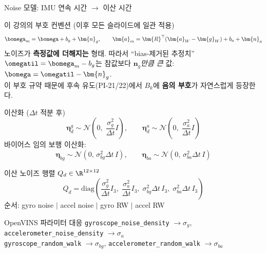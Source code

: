 \begin{frame}[shrink=15]{Noise 모델: IMU 연속 시간 $\to$ 이산 시간}

  \begin{alertblock}{\small 이 강의의 부호 컨벤션 (이후 모든 슬라이드에 일관 적용)}
    \footnotesize
    \[
      \bomega_m = \bomega + b_g + \bm{n}_g,\qquad
      \bm{a}_m = \bm{R}^\top(\bm{a}_W - \bm{g}_W) + b_a + \bm{n}_a
    \]
    노이즈가 \textbf{측정값에 더해지는} 형태. 따라서 ``bias-제거된 추정치''
    $\omegatil = \bomega_m - b_g$는 참값보다 \emph{$\bm{n}_g$만큼 큰} 값:
    $\bomega = \omegatil - \bm{n}_g$.\\
    이 부호 규약 때문에 후속 유도(PI-21/22)에서 $B_k$에 \textbf{음의 부호}가 자연스럽게 등장한다.
  \end{alertblock}

  \pause
  \vspace{0.4em}
  \begin{block}{이산화 ($\Delta t$ 적분 후)}
    \[
      \bm{\eta}_d^g \sim \mathcal{N}\!\left(0,\;\frac{\sigma_g^2}{\Delta t}I\right),
      \qquad
      \bm{\eta}_d^a \sim \mathcal{N}\!\left(0,\;\frac{\sigma_a^2}{\Delta t}I\right)
    \]
    바이어스 임의 보행 이산화:
    \[
      \bm{\eta}_{bg} \sim \mathcal{N}(0,\,\sigma_{bg}^2\Delta t\,I),
      \qquad
      \bm{\eta}_{ba} \sim \mathcal{N}(0,\,\sigma_{ba}^2\Delta t\,I)
    \]
  \end{block}

  \pause
  \begin{block}{이산 노이즈 행렬 $Q_d \in \R^{12\times 12}$}
    \[
      Q_d = \mathrm{diag}\!\left(
        \frac{\sigma_g^2}{\Delta t}I_3,\;
        \frac{\sigma_a^2}{\Delta t}I_3,\;
        \sigma_{bg}^2\Delta t\,I_3,\;
        \sigma_{ba}^2\Delta t\,I_3
      \right)
    \]
    순서: gyro noise $|$ accel noise $|$ gyro RW $|$ accel RW
  \end{block}

  \pause
  \begin{exampleblock}{OpenVINS 파라미터 대응}
    \texttt{gyroscope\_noise\_density} $\to \sigma_g$,\quad
    \texttt{accelerometer\_noise\_density} $\to \sigma_a$\\
    \texttt{gyroscope\_random\_walk} $\to \sigma_{bg}$,\quad
    \texttt{accelerometer\_random\_walk} $\to \sigma_{ba}$
  \end{exampleblock}


\end{frame}
